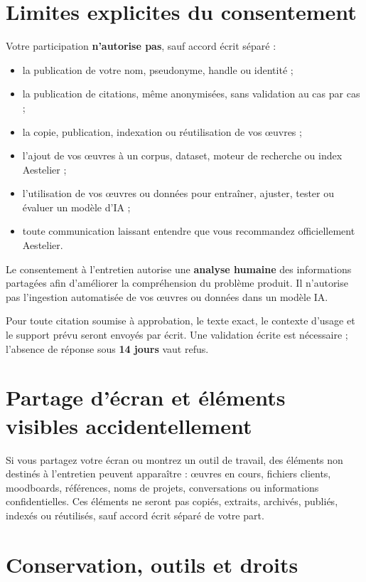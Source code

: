 \documentclass[10pt,a4paper]{article}
\begin{document}
\section{Limites explicites du consentement}

Votre participation \textbf{n'autorise pas}, sauf accord écrit séparé :

\begin{itemize}
  \item la publication de votre nom, pseudonyme, handle ou identité ;
  \item la publication de citations, même anonymisées, sans validation au cas par cas ;
  \item la copie, publication, indexation ou réutilisation de vos œuvres ;
  \item l'ajout de vos œuvres à un corpus, dataset, moteur de recherche ou index Aestelier ;
  \item l'utilisation de vos œuvres ou données pour entraîner, ajuster, tester ou évaluer un modèle d'IA ;
  \item toute communication laissant entendre que vous recommandez officiellement Aestelier.
\end{itemize}

Le consentement à l'entretien autorise une \textbf{analyse humaine} des informations partagées afin d'améliorer la compréhension du problème produit. Il n'autorise pas l'ingestion automatisée de vos œuvres ou données dans un modèle IA.

Pour toute citation soumise à approbation, le texte exact, le contexte d'usage et le support prévu seront envoyés par écrit. Une validation écrite est nécessaire ; l'absence de réponse sous \textbf{14 jours} vaut refus.

\section{Partage d'écran et éléments visibles accidentellement}

Si vous partagez votre écran ou montrez un outil de travail, des éléments non destinés à l'entretien peuvent apparaître : œuvres en cours, fichiers clients, moodboards, références, noms de projets, conversations ou informations confidentielles. Ces éléments ne seront pas copiés, extraits, archivés, publiés, indexés ou réutilisés, sauf accord écrit séparé de votre part.

\section{Conservation, outils et droits}
\end{document}
